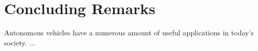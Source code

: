\documentclass[letterpaper,12pt]{article}   %
\begin{document}




\section{Concluding Remarks}
Autonomous vehicles have a numerous amount of useful applications in today's society. ...

\pagebreak


\end{document}
